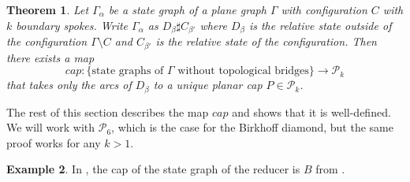 \documentclass[12pt]{amsart}
\newtheorem{theorem}{Theorem}[section]
\theoremstyle{definition}
\newtheorem{example}[theorem]{Example}
\theoremstyle{remark}
\numberwithin{equation}{section}
\newcommand{\ra}{\rightarrow}
\begin{document}
\begin{theorem}
Let $\Gamma_\alpha$ be a state graph of a plane graph $\Gamma$ with configuration $C$ with $k$ boundary spokes. Write  $\Gamma_\alpha$ as $D_\beta\sharp C_{\beta'}$ where $D_\beta$ is the relative state outside of the configuration $\Gamma\setminus C$ and $C_{\beta'}$ is the relative state of the configuration.  Then there exists a map $$cap:\{\mbox{state graphs of $\Gamma$ without topological bridges}\} \ra \mathcal{P}_k$$ that takes only the arcs of $D_\beta$ to a unique planar cap $P\in \mathcal{P}_k$.
\label{theorem:cap-map}
\end{theorem}

The rest of this section describes the map $cap$ and shows that it is well-defined. We will work with $\mathcal{P}_6$, which is the case for the Birkhoff diamond, but the same proof works for any $k>1$. 

\begin{example} In , the cap of the state graph of the reducer is $B$ from .
\end{example}  
\end{document}
